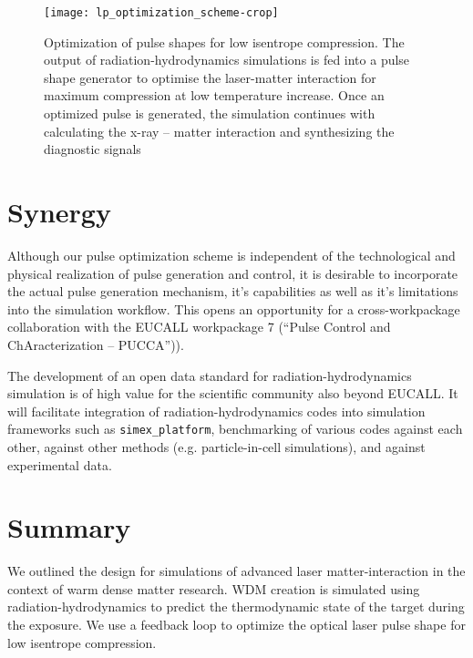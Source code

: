 \documentclass[12pt]{scrartcl}
\begin{document}
\begin{figure}[ht]
  \begin{center}
    \texttt{[image: lp\_optimization\_scheme-crop]}
  \end{center}
  \caption{Optimization of pulse shapes for low isentrope compression. The
  output of radiation-hydrodynamics simulations is fed into a pulse shape
generator to optimise the laser-matter interaction for maximum compression at
low temperature increase. Once an optimized pulse is generated, the simulation
continues with calculating the x-ray -- matter interaction and synthesizing the
diagnostic signals}
  \label{fig:lp_optimization_schem}
\end{figure}

\section{Synergy}

Although our pulse optimization scheme is  independent of the technological and
physical realization of pulse generation and control, it is desirable to
incorporate the actual pulse generation mechanism, it's capabilities as well as
it's limitations into the simulation workflow.  This opens an opportunity for
a cross-workpackage collaboration with the EUCALL workpackage 7 (``Pulse Control and
ChAracterization -- PUCCA'')).

The development of an open data standard for radiation-hydrodynamics simulation is of high value for the scientific community
also beyond EUCALL. It will facilitate integration of radiation-hydrodynamics codes into simulation frameworks such as
\texttt{simex\_platform}, benchmarking of various codes against each other, against other methods (e.g. particle-in-cell simulations), and
against experimental data.

\section{Summary}
We outlined the design for simulations of advanced laser matter-interaction in the context of warm dense matter research. WDM creation is
simulated using radiation-hydrodynamics to predict the thermodynamic state of the target during the exposure. We use a feedback loop
to optimize the optical laser pulse shape for low isentrope compression.






\printbibliography
\end{document}
